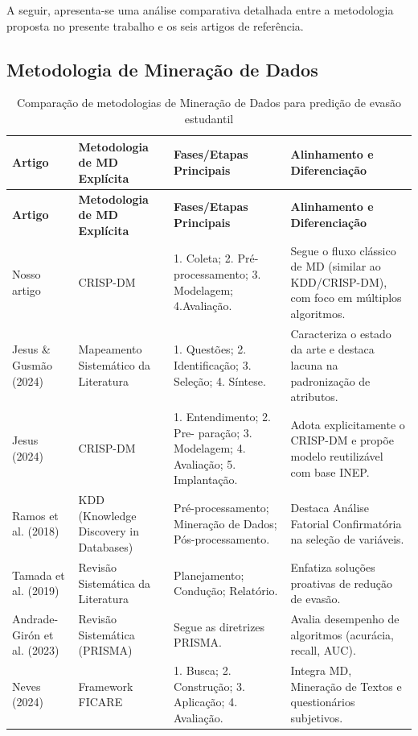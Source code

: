 \documentclass[english, spanish, brazilian]{RBIEarticle} %
\begin{document}
A seguir, apresenta-se uma análise comparativa detalhada entre a metodologia proposta no presente trabalho e os seis artigos de referência.


\subsection{Metodologia de Mineração de Dados}

\begin{longtable}{|p{3cm}|p{3.5cm}|p{4.5cm}|p{5cm}|}
    \caption{Comparação de metodologias de Mineração de Dados para predição de evasão estudantil}\\
    \toprule
    \textbf{Artigo} & \textbf{Metodologia de MD Explícita} & \textbf{Fases/Etapas Principais} & \textbf{Alinhamento e Diferenciação} \\
    \midrule
    \endfirsthead
    \toprule
    \textbf{Artigo} & \textbf{Metodologia de MD Explícita} & \textbf{Fases/Etapas Principais} & \textbf{Alinhamento e Diferenciação} \\
    \midrule
    \endhead
    Nosso artigo & CRISP-DM & 1. Coleta; 2. Pré-processamento; 3. Modelagem; 4.Avaliação. & Segue o fluxo clássico de MD (similar ao KDD/CRISP-DM), com foco em múltiplos algoritmos. \\ \hline
    
    Jesus \& Gusmão (2024) & Mapeamento Sistemático da Literatura & 1. Questões; 2. Identificação; 3. Seleção; 4. Síntese. & Caracteriza o estado da arte e destaca lacuna na padronização de atributos. \\ \hline
    
    Jesus (2024) & CRISP-DM & 1. Entendimento; 2. Pre- paração; 3. Modelagem; 4. Avaliação; 5. Implantação. & Adota explicitamente o CRISP-DM e propõe modelo reutilizável com base INEP. \\ \hline
    
    Ramos et al. (2018) & KDD (Knowledge Discovery in Databases) & Pré-processamento; Mineração de Dados; Pós-processamento. & Destaca Análise Fatorial Confirmatória na seleção de variáveis. \\ \hline
    
    Tamada et al. (2019) & Revisão Sistemática da Literatura & Planejamento; Condução; Relatório. & Enfatiza soluções proativas de redução de evasão. \\ \hline
    
    Andrade-Girón et al. (2023) & Revisão Sistemática (PRISMA) & Segue as diretrizes PRISMA. & Avalia desempenho de algoritmos (acurácia, recall, AUC). \\ \hline
    
    Neves (2024) & Framework FICARE & 1. Busca; 2. Construção; 3. Aplicação; 4. Avaliação. & Integra MD, Mineração de Textos e questionários subjetivos. \\
    \bottomrule
\end{longtable}
\end{document}
